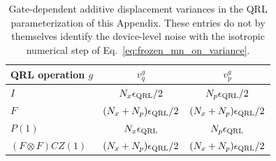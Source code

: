 \documentclass[aps,
prx,
superscriptaddress,
reprint,
longbibliography,
floatfix]{revtex4-2}
\begin{document}
\begin{table}[tbp]
\centering
\small
\begin{tabular}{lcc}
\toprule
QRL operation $g$ & $v_q^{g}$ & $v_p^{g}$ \\
\midrule
$I$ & $N_x\epsilon_{\rm QRL}/2$ & $N_p\epsilon_{\rm QRL}/2$ \\
$F$ & $(N_x+N_p)\epsilon_{\rm QRL}/2$ & $(N_x+N_p)\epsilon_{\rm QRL}/2$ \\
$P(1)$ & $N_x\epsilon_{\rm QRL}$ & $N_p\epsilon_{\rm QRL}$ \\
$(F\otimes F)CZ(1)$ & $(N_x+N_p)\epsilon_{\rm QRL}/2$ & $(N_x+N_p)\epsilon_{\rm QRL}/2$ \\
\bottomrule
\end{tabular}
\caption{Gate-dependent additive displacement variances in the QRL parameterization of this Appendix. These entries do not by themselves identify the device-level noise with the isotropic numerical step of Eq.~\eqref{eq:frozen_mn_on_variance}.}
\label{tab:supp_qrl_operation_noise}
\end{table}
\end{document}
